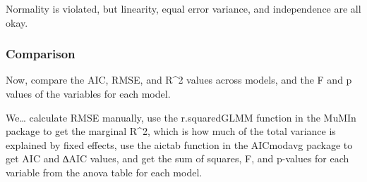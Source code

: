 \documentclass[
]{article}
\begin{document}
Normality is violated, but linearity, equal error variance, and
independence are all okay.

\hypertarget{comparison-2}{%
\subsubsection{Comparison}\label{comparison-2}}

Now, compare the AIC, RMSE, and R\^{}2 values across models, and the F
and p values of the variables for each model.

We\ldots{} calculate RMSE manually, use the r.squaredGLMM function in
the MuMIn package to get the marginal R\^{}2, which is how much of the
total variance is explained by fixed effects, use the aictab function in
the AICmodavg package to get AIC and ∆AIC values, and get the sum of
squares, F, and p-values for each variable from the anova table for each
model.
\end{document}
